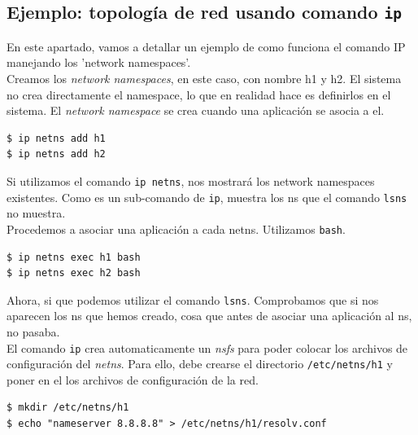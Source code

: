 \documentclass[12pt]{article}
\begin{document}
	
	\pagebreak
	
	\subsection{Ejemplo: topología de red usando comando \texttt{ip}}
	\noindent En este apartado, vamos a detallar un ejemplo de como funciona el comando IP manejando los 'network namespaces'.\\
	
	\noindent Creamos los \textit{network namespaces}, en este caso, con nombre h1 y h2. El sistema no crea directamente el namespace, lo que en realidad hace es definirlos en el sistema. El \textit{network namespace} se crea cuando una aplicación se asocia a el.
	\begin{verbatim}
$ ip netns add h1
$ ip netns add h2
	\end{verbatim}

	\noindent Si utilizamos el comando \texttt{ip netns}, nos mostrará los network namespaces existentes. Como es un sub-comando de \texttt{ip}, muestra los ns que el comando \texttt{lsns} no muestra. \\
	
	\noindent Procedemos a asociar una aplicación a cada netns. Utilizamos \texttt{bash}.
	\begin{verbatim}
$ ip netns exec h1 bash
$ ip netns exec h2 bash
	\end{verbatim}

	\noindent Ahora, si que podemos utilizar el comando \texttt{lsns}. Comprobamos que si nos aparecen los ns que hemos creado, cosa que antes de asociar una aplicación al ns, no pasaba. \\
	
	\noindent El comando \texttt{ip} crea automaticamente un \textit{nsfs} para poder colocar los archivos de configuración del \textit{netns}. Para ello, debe crearse el directorio \texttt{/etc/netns/h1} y poner en el los archivos de configuración de la red.
	\begin{verbatim}
$ mkdir /etc/netns/h1
$ echo "nameserver 8.8.8.8" > /etc/netns/h1/resolv.conf
	\end{verbatim}
\end{document}
